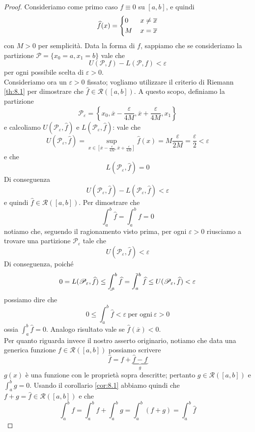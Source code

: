 \begin{proof}
    Consideriamo come primo caso $f\equiv 0$ su $[a,b]$, e quindi
    \[
    \widehat{f}(x) = \begin{dcases}
        0\, & x\ne \overline{x}\\
        M\, & x=\overline{x}
    \end{dcases}
    \]
    con $M>0$ per semplicità. Data la forma di $f$, sappiamo che se consideriamo la partizione $\mathscr{P}=\{x_0 = a, x_1 = b\}$ vale che
    \[
    U(\mathscr{P}, f) -L(\mathscr{P}, f) <\varepsilon
    \]
    per ogni possibile scelta di $\varepsilon>0$. \\
    Consideriamo ora un $\varepsilon>0$ fissato; vogliamo utilizzare il criterio di Riemann \ref{th:8.1} per dimostrare che $\widehat{f}\in\mathscr{R}([a,b])$. A questo scopo, definiamo la partizione
    \[
    \mathscr{P}_\varepsilon = \left\{x_0, \overline{x}-\frac{\varepsilon}{4M}, \overline{x}+\frac{\varepsilon}{4M}, x_1\right\}
    \]
    e calcoliamo $U(\mathscr{P}_\varepsilon, \widehat{f})$ e $L(\mathscr{P}_\varepsilon, \widehat{f})$: vale che
    \[
    U(\mathscr{P}_\varepsilon, \widehat{f}) = \sup_{x\in \left[\overline{x}-\frac{\varepsilon}{4M}, \overline{x}+\frac{\varepsilon}{4M}\right]} \widehat{f}(x) = M \frac{\varepsilon}{2M} = \frac{\varepsilon}{2}<\varepsilon
    \]
    e che
    \[
    L(\mathscr{P}_\varepsilon, \widehat{f}) = 0 
    \]
    Di conseguenza 
    \[
    U(\mathscr{P}_\varepsilon, \widehat{f}) - L(\mathscr{P}_\varepsilon, \widehat{f})<\varepsilon 
    \]
    e quindi $\widehat{f}\in\mathscr{R}([a,b])$. Per dimostrare che
    \[
    \int_a^b \widehat{f} = \int_a^b f = 0
    \]
    notiamo che, seguendo il ragionamento visto prima, per ogni $\varepsilon>0$ riusciamo a trovare una partizione $\mathscr{P}_\varepsilon$ tale che 
    \[
    U(\mathscr{P}_\varepsilon, \widehat{f})<\varepsilon
    \]
    Di conseguenza, poiché
    \[
    0= L(\mathscr{P}_\varepsilon, \widehat{f}) \le \bint_a^b \widehat{f} = \aint_a^b \widehat{f} \le U(\mathscr{P}_\varepsilon, \widehat{f})<\varepsilon
    \]
    possiamo dire che
    \[
    0\le \int_a^b \widehat{f} < \varepsilon \ \text{per ogni} \ \varepsilon>0
    \]
    ossia $\int_a^b \widehat{f} = 0$. Analogo risultato vale se $\widehat{f}(\overline{x})<0$.\\
    Per quanto riguarda invece il nostro asserto originario, notiamo che data una generica funzione $f\in\mathscr{R}([a,b])$ possiamo scrivere
    \[
    \widehat{f} = f + \underbrace{\widehat{f}-f}_{g}
    \]
    $g(x)$ è una funzione con le proprietà sopra descritte; pertanto $g\in\mathscr{R}([a,b])$ e $\int_a^b g = 0$. Usando il corollario \ref{cor:8.1} abbiamo quindi che $f+g = \widehat{f}\in\mathscr{R}([a,b])$ e che
    \[
    \int_a^b f = \int_a^b f + \int_a^b g = \int_a^b(f+g) = \int_a^b \widehat{f}
    \]
\end{proof}
